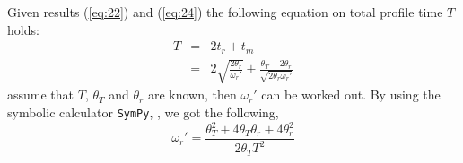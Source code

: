 \documentclass[a4paper]{article}
\begin{document}
Given results (\ref{eq:22}) and (\ref{eq:24}) the following equation on
total profile time $T$ holds:
\begin{eqnarray}
  \label{eq:1}
  T &=& 2t_r + t_m \\
    &=& 2\sqrt{\frac{2\theta_r}{\omega_r'}} +
        \frac{\theta_T-2\theta_r}{\sqrt{2\theta_r\omega_r'}}
\end{eqnarray}
assume that $T$, $\theta_T$ and $\theta_r$ are known, then $\omega_r'$
can be worked out. By using the symbolic calculator \texttt{SymPy},
\cite{team20:_sympy}, we got the following,
\begin{equation}
  \label{eq:3}
  \omega_r' = \frac{\theta_T^2 + 4\theta_T\theta_r + 4\theta_r^2}{2\theta_T T^2}
\end{equation}

\printbibliography
\end{document}
